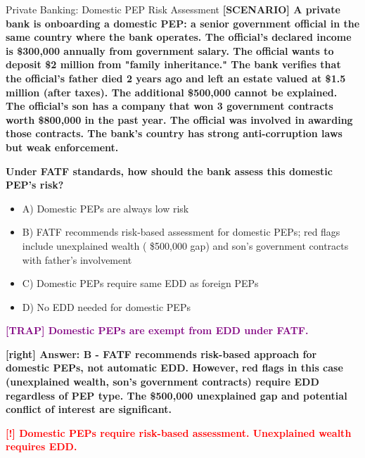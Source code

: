 \documentclass[11pt,a4paper]{beamer}
\newcommand{\redflag}[1]{\textcolor{red}{\textbf{[!] #1}}}
\newcommand{\trap}[1]{\textcolor{purple}{\textbf{[TRAP] #1}}}
\newcommand{\correct}[1]{\textcolor{green!50!black}{\textbf{[right] #1}}}
\newcommand{\scenario}[1]{\textcolor{blue!70!black}{\textbf{[SCENARIO] #1}}}
\begin{document}
	
	\begin{frame}{Private Banking: Domestic PEP Risk Assessment}
		\tiny
		\scenario{A private bank is onboarding a domestic PEP: a senior government official in the same country where the bank operates. The official's declared income is \$300,000 annually from government salary. The official wants to deposit \$2 million from "family inheritance." The bank verifies that the official's father died 2 years ago and left an estate valued at \$1.5 million (after taxes). The additional \$500,000 cannot be explained. The official's son has a company that won 3 government contracts worth \$800,000 in the past year. The official was involved in awarding those contracts. The bank's country has strong anti-corruption laws but weak enforcement.}
		
		\vspace{0.02cm}
		\textbf{Under FATF standards, how should the bank assess this domestic PEP's risk?}
		\vspace{0.02cm}
		
		\begin{itemize}
			\item A) Domestic PEPs are always low risk
			\item B) FATF recommends risk-based assessment for domestic PEPs; red flags include unexplained wealth ( \$500,000 gap) and son's government contracts with father's involvement
			\item C) Domestic PEPs require same EDD as foreign PEPs
			\item D) No EDD needed for domestic PEPs
		\end{itemize}
		
		\vspace{0.02cm}
		\trap{Domestic PEPs are exempt from EDD under FATF.}
		
		\vspace{0.02cm}
		\correct{Answer: B - FATF recommends risk-based approach for domestic PEPs, not automatic EDD. However, red flags in this case (unexplained wealth, son's government contracts) require EDD regardless of PEP type. The \$500,000 unexplained gap and potential conflict of interest are significant.}
		
		\vspace{0.02cm}
		\redflag{Domestic PEPs require risk-based assessment. Unexplained wealth requires EDD.}
	\end{frame}
	
\end{document}
